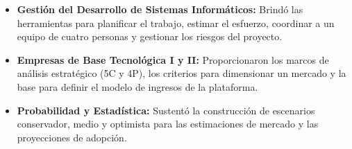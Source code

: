\begin{itemize}
    \item \textbf{Gestión del Desarrollo de Sistemas Informáticos:} Brindó las herramientas para planificar el trabajo, estimar el esfuerzo, coordinar a un equipo de cuatro personas y gestionar los riesgos del proyecto.
    \item \textbf{Empresas de Base Tecnológica I y II:} Proporcionaron los marcos de análisis estratégico (5C y 4P), los criterios para dimensionar un mercado y la base para definir el modelo de ingresos de la plataforma.
    \item \textbf{Probabilidad y Estadística:} Sustentó la construcción de escenarios conservador, medio y optimista para las estimaciones de mercado y las proyecciones de adopción.
\end{itemize}
